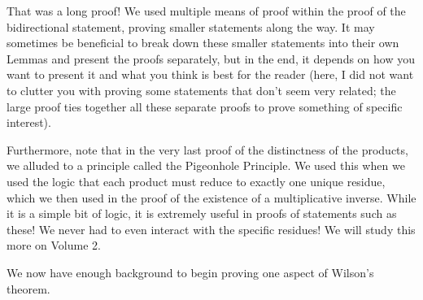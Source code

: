 That was a long proof! We used multiple means of proof within the proof of the bidirectional statement, proving smaller statements along the way. It may sometimes be beneficial to break down these smaller statements into their own Lemmas and present the proofs separately, but in the end, it depends on how you want to present it and what you think is best for the reader (here, I did not want to clutter you with proving some statements that don't seem very related; the large proof ties together all these separate proofs to prove something of specific interest).

Furthermore, note that in the very last proof of the distinctness of the products, we alluded to a principle called the Pigeonhole Principle. We used this when we used the logic that each product must reduce to exactly one unique residue, which we then used in the proof of the existence of a multiplicative inverse. While it is a simple bit of logic, it is extremely useful in proofs of statements such as these! We never had to even interact with the specific residues! We will study this more on Volume 2.

We now have enough background to begin proving one aspect of Wilson's theorem.

